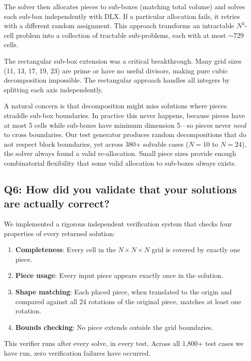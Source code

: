 \documentclass[11pt]{article}
\begin{document}
The solver then allocates pieces to sub-boxes (matching total volume) and solves each sub-box independently with DLX. If a particular allocation fails, it retries with a different random assignment. This approach transforms an intractable $N^3$-cell problem into a collection of tractable sub-problems, each with at most $\sim$729 cells.

The rectangular sub-box extension was a critical breakthrough. Many grid sizes (11, 13, 17, 19, 23) are prime or have no useful divisors, making pure cubic decomposition impossible. The rectangular approach handles all integers by splitting each axis independently.

A natural concern is that decomposition might miss solutions where pieces straddle sub-box boundaries. In practice this never happens, because pieces have at most 5 cells while sub-boxes have minimum dimension 5---so pieces never \emph{need} to cross boundaries. Our test generator produces random decompositions that do not respect block boundaries, yet across 380+ solvable cases ($N=10$ to $N=24$), the solver always found a valid re-allocation. Small piece sizes provide enough combinatorial flexibility that some valid allocation to sub-boxes always exists.

\subsection*{Q6: How did you validate that your solutions are actually correct?}

We implemented a rigorous independent verification system that checks four properties of every returned solution:

\begin{enumerate}[nosep]
  \item \textbf{Completeness}: Every cell in the $N \times N \times N$ grid is covered by exactly one piece.
  \item \textbf{Piece usage}: Every input piece appears exactly once in the solution.
  \item \textbf{Shape matching}: Each placed piece, when translated to the origin and compared against all 24 rotations of the original piece, matches at least one rotation.
  \item \textbf{Bounds checking}: No piece extends outside the grid boundaries.
\end{enumerate}

This verifier runs after every solve, in every test. Across all 1,800+ test cases we have run, zero verification failures have occurred.
\end{document}
